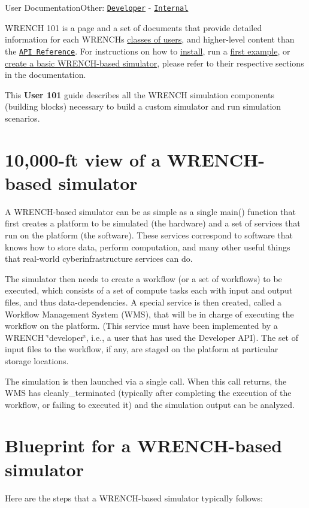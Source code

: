 User DocumentationOther\+: \href{../developer/wrench-101.html}{\tt Developer} -\/ \href{../internal/wrench-101.html}{\tt Internal}

W\+R\+E\+N\+CH 101 is a page and a set of documents that provide detailed information for each W\+R\+E\+N\+CH\textquotesingle{}s \hyperlink{index_overview-users}{classes of users}, and higher-\/level content than the \href{./annotated.html}{\tt A\+PI Reference}. For instructions on how to \hyperlink{install}{install}, run a \hyperlink{getting-started}{first example}, or \hyperlink{getting-started_getting-started-prep}{create a basic W\+R\+E\+N\+C\+H-\/based simulator}, please refer to their respective sections in the documentation.

This {\bfseries User 101} guide describes all the W\+R\+E\+N\+CH simulation components (building blocks) necessary to build a custom simulator and run simulation scenarios.



\hypertarget{wrench-101_wrench-101-simulator-10000ft}{}\section{10,000-\/ft view of a W\+R\+E\+N\+C\+H-\/based simulator}\label{wrench-101_wrench-101-simulator-10000ft}
A W\+R\+E\+N\+C\+H-\/based simulator can be as simple as a single {\ttfamily main()} function that first creates a platform to be simulated (the hardware) and a set of services that run on the platform (the software). These services correspond to software that knows how to store data, perform computation, and many other useful things that real-\/world cyberinfrastructure services can do.

The simulator then needs to create a workflow (or a set of workflows) to be executed, which consists of a set of compute tasks each with input and output files, and thus data-\/dependencies. A special service is then created, called a Workflow Management System (W\+MS), that will be in charge of executing the workflow on the platform. (This service must have been implemented by a W\+R\+E\+N\+CH \char`\"{}developer\char`\"{}, i.\+e., a user that has used the Developer A\+PI). The set of input files to the workflow, if any, are staged on the platform at particular storage locations.

The simulation is then launched via a single call. When this call returns, the W\+MS has cleanly\+\_\+terminated (typically after completing the execution of the workflow, or failing to executed it) and the simulation output can be analyzed.\hypertarget{wrench-101_wrench-101-simulator-blueprint}{}\section{Blueprint for a W\+R\+E\+N\+C\+H-\/based simulator}\label{wrench-101_wrench-101-simulator-blueprint}
Here are the steps that a W\+R\+E\+N\+C\+H-\/based simulator typically follows\+:


